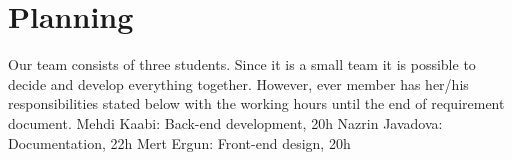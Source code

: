 \newpage
\section{Planning}
\quad Our team consists of three students. Since it is a small team it is possible to decide and develop everything together. However, ever member has her/his responsibilities stated below with the working hours until the end of requirement document.\newline
\newline
Mehdi Kaabi: Back-end development, 20h\newline
Nazrin Javadova: Documentation, 22h\newline
Mert Ergun: Front-end design, 20h
